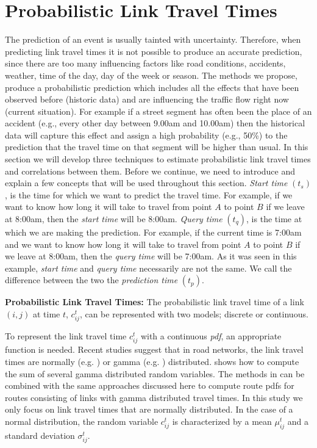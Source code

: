 \section{Probabilistic Link Travel Times}
\label{sec:lttestimation} 
The prediction of an event is usually tainted with uncertainty. Therefore, when predicting link travel times it is not possible to produce an accurate prediction, since there are too many influencing factors like road conditions, accidents, weather, time of the day, day of the week or season. The methods we propose, produce a probabilistic prediction which includes all the effects that have been observed before (historic data) and are influencing the traffic flow right now (current situation). For example if a street segment has often been the place of an accident (e.g., every other day between 9.00am and 10.00am) then the historical data will capture this effect and assign a high probability (e.g., 50\%) to the prediction that the travel time on that segment will be higher than usual. In this section we will develop three techniques to estimate probabilistic link travel times and correlations between them.
%
Before we continue, we need to introduce and explain a few concepts that will be used throughout this section. \textit{Start time} $(t_s)$, is the time for which we want to predict the travel time. For example, if we want to know how long it will take to travel from point $A$ to point $B$ if we leave at 8:00am, then the \textit{start time} will be 8:00am. \textit{Query time} $(t_q)$, is the time at which we are making the prediction. For example, if the current time is 7:00am and we want to know how long it will take to travel from point $A$ to point $B$ if we leave at 8:00am, then the \textit{query time} will be 7:00am. As it was seen in this example, \textit{start time} and \textit{query time} necessarily are not the same. We call the difference between the two the \textit{prediction time} $(t_p)$.

\textbf{Probabilistic Link Travel Times: } The probabilistic link travel time of a link $(i,j)$ at time $t$, $c_{ij}^t$, can be represented with two models; discrete or continuous.

To represent the link travel time $c_{ij}^t$ with a continuous \textit{pdf}, an appropriate function is needed. Recent studies suggest that in road networks, the link travel times are normally (e.g. \cite{Seshadri10}) or gamma (e.g. \cite{Zockaei13}) distributed. \cite{Moschopoulos85} shows how to compute the sum of several gamma distributed random variables. The methods in \cite{Moschopoulos85} can be combined with the same approaches discussed here to compute route pdfs for routes consisting of links with gamma distributed travel times. In this study we only focus on link travel times that are normally distributed. In the case of a normal distribution, the random variable $c_{ij}^t$ is characterized by a mean $\mu_{ij}^t$ and a standard deviation $\sigma_{ij}^t$.

